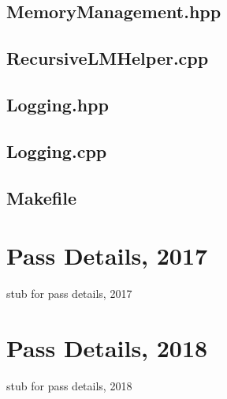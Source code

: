 \begin{appendices}
\section{MemoryManagement.hpp} \label{app:CppCode:memManage}

\clearpage
\section{RecursiveLMHelper.cpp} \label{app:CppCode:rlmHelper}

\clearpage
\section{Logging.hpp} \label{app:CppCode:loggingh}

\clearpage
\section{Logging.cpp} \label{app:CppCode:loggingc}

\clearpage
\section{Makefile} \label{app:CppCode:make}

\clearpage


\chapter{Pass Details, 2017}
\par stub for pass details, 2017
\chapter{Pass Details, 2018}
\par stub for pass details, 2018



\end{appendices}